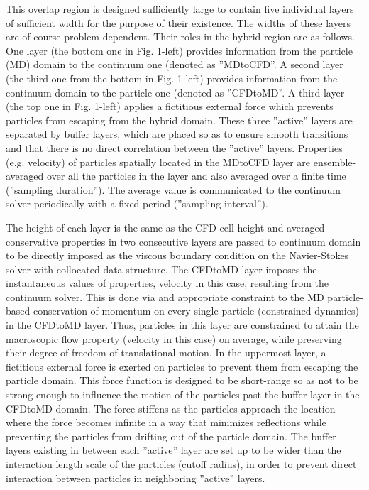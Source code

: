 \documentclass[preprint,12pt]{elsarticle}
\begin{document}
This overlap region is designed sufficiently large to contain five individual layers of sufficient width for the purpose of their existence. The widths of these layers are of course problem dependent. Their roles in the hybrid region are as follows. One layer (the bottom one in Fig. 1-left) provides information from the particle (MD) domain to the continuum one (denoted as ''MDtoCFD''. A second layer (the third one from the bottom in Fig. 1-left) provides information from the continuum domain to the particle one (denoted as ''CFDtoMD''. A third layer (the top one in Fig. 1-left) applies a fictitious external force which prevents particles from escaping from the hybrid domain. These three ''active'' layers are separated by buffer layers, which are placed so as to ensure smooth transitions and that there is no direct correlation between the ''active'' layers. Properties (e.g. velocity) of particles spatially located in the MDtoCFD layer are ensemble-averaged over all the particles in the layer and also averaged over a finite time (''sampling duration''). The average value is communicated to the continuum solver periodically with a fixed period (''sampling interval'').

The height of each layer is the same as the CFD cell height and averaged conservative properties in two consecutive layers are passed to continuum domain to be directly imposed as the viscous boundary condition on the Navier-Stokes solver with collocated data structure. The CFDtoMD layer imposes the instantaneous values of properties, velocity in this case, resulting from the continuum solver. This is done via and appropriate constraint to the MD particle-based conservation of momentum on every single particle (constrained dynamics) in the CFDtoMD layer. Thus, particles in this layer are constrained to attain the macroscopic flow property (velocity in this case) on average, while preserving their degree-of-freedom of translational motion. In the uppermost layer, a fictitious external force is exerted on particles to prevent them from escaping the particle domain. This force function is designed to be short-range so as not to be strong enough to influence the motion of the particles past the buffer layer in the CFDtoMD domain. The force stiffens as the particles approach the location where the force becomes infinite in a way that minimizes reflections while preventing the particles from drifting out of the particle domain. The buffer layers existing in between each ''active'' layer are set up to be wider than the interaction length scale of the particles (cutoff radius), in order to prevent direct interaction between particles in neighboring ''active'' layers.
\end{document}

